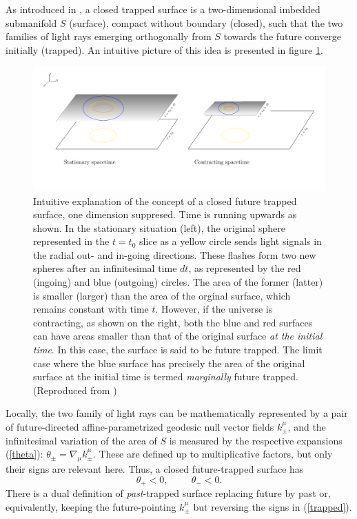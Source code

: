 \documentclass[12pt]{iopart}
\def\be{\begin{equation}}
\def\ee{\end{equation}}
\begin{document}
As introduced in \cite{P}, a closed trapped surface is a two-dimensional imbedded submanifold $S$ (surface), compact without boundary (closed), such that the two families of light rays emerging orthogonally from $S$ towards the future converge initially (trapped). An intuitive picture of this idea is presented in figure \ref{fig:Senovilla1}.
\begin{figure}
  \includegraphics[height=.35\textheight]{Senovilla1}
  \caption{Intuitive explanation of the concept of a closed future trapped surface, one dimension suppresed. Time is running upwards as shown. In the stationary situation (left), the original sphere represented in the $t=t_0$ slice as a yellow circle sends light signals in the radial out- and in-going directions. These flashes form two new spheres after an infinitesimal time $dt$, as represented by the red (ingoing) and blue (outgoing) circles. The area of the former (latter) is smaller (larger) than the area of the orginal surface, which remains constant with time $t$. However, if the universe is contracting, as shown on the right, both the blue and red surfaces can have areas smaller than that of the original surface {\em at the initial time}. In this case, the surface is said to be future trapped. The limit case where the blue surface has precisely the area of the original surface at the initial time is termed {\em marginally} future trapped. (Reproduced from \cite{SMex})}
  \label{fig:Senovilla1}
\end{figure}
Locally, the two family of light rays can be mathematically represented by a pair of future-directed affine-parametrized geodesic null vector fields $k_\pm^\mu$, and the infinitesimal variation of the area of $S$ is measured by the respective expansions (\ref{theta}): $\theta_\pm =\nabla_\mu k^\mu_\pm$. These are defined up to multiplicative factors, but only their signs are relevant here. Thus, a closed future-trapped surface has
\be
\theta_+ <0, \hspace{1cm} \theta_- <0 . \label{trapped}
\ee
There is a dual definition of {\em past}-trapped surface replacing future by past or, equivalently, keeping the future-pointing $k^\mu_\pm$ but reversing the signs in (\ref{trapped}).
\end{document}
